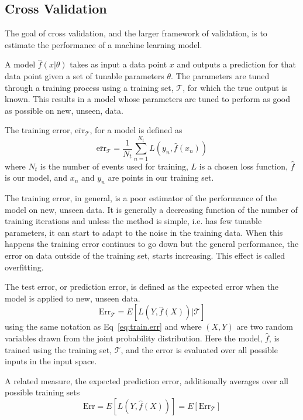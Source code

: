 
\subsection{Cross Validation}
\label{sec:cross:validation}

The goal of cross validation, and the larger framework of validation, is to estimate the performance of a machine learning model.

A model $\hat{f}(x | \theta)$ takes as input a data point $x$ and outputs a prediction for that data point given a set of tunable parameters $\theta$. The parameters are tuned through a training process using a training set, $\mathcal{T}$, for which the true output is known. This results in a model whose parameters are tuned to perform as good as possible on new, unseen, data.

The training error, $\overline{\text{err}}_{\mathcal{T}}$, for a model is defined as
\begin{equation}
\overline{\text{err}}_{\mathcal{T}} = \frac{1}{N_t}\sum_{n=1}^{N_t}L(y_n, \hat{f}(x_n))
\label{eq:train.err}
\end{equation}
where $N_t$ is the number of events used for training, $L$ is a chosen loss function, $\hat{f}$ is our model, and $x_n$ and $y_n$ are points in our training set.

The training error, in general, is a poor estimator of the performance of the model on new, unseen data. It is generally a decreasing function of the number of training iterations and unless the method is simple, i.e. has few tunable parameters, it can start to adapt to the noise in the training data. When this happens the training error continues to go down but the general performance, the error on data outside of the training set, starts increasing. This effect is called overfitting.

The test error, or prediction error, is defined as the expected error when the model is applied to new, unseen data.
\begin{equation}
\text{Err}_{\mathcal{T}} = E\left[L(Y,\hat{f}(X)) | \mathcal{T} \right]
\end{equation}
using the same notation as Eq~\ref{eq:train.err} and where $(X, Y)$ are two random variables drawn from the joint probability distribution. Here the model, $\hat{f}$, is trained using the training set, $\mathcal{T}$, and the error is evaluated over all possible inputs in the input space.

A related measure, the expected prediction error, additionally averages over all possible training sets
\begin{equation}
\text{Err} = E\left[L(Y, \hat{f}(X))\right] = E\left[\text{Err}_{\mathcal{T}}\right]
\end{equation}


